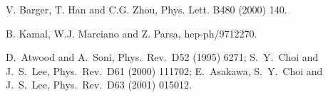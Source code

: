 \begin{thebibliography}{999}
 V. Barger, T. Han and C.G. Zhou, Phys. Lett. B480 (2000) 140. 

 B. Kamal, W.J. Marciano and Z. Parsa, hep-ph/9712270. 

D.~Atwood and A.~Soni, Phys.\ Rev.\ D52 (1995) 6271; 
S.~Y.~Choi and J.~S.~Lee, Phys.\ Rev.\ D61 (2000) 111702; 
E.~Asakawa, S.~Y.~Choi and J.~S.~Lee, Phys.\ Rev.\ D63 (2001) 015012.  


\end{thebibliography}

